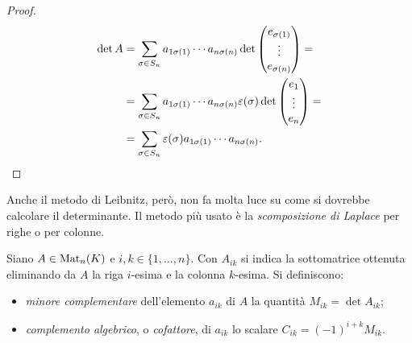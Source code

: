 \begin{proof}
\begin{equation*}
		\begin{split}
			\det A&=\sum_{\sigma\in S_n}a_{1\sigma(1)}\cdots a_{n\sigma(n)}\det\begin{pmatrix}e_{\sigma(1)}\\\vdots\\e_{\sigma(n)}\end{pmatrix}=\\
			&=\sum_{\sigma\in S_n}a_{1\sigma(1)}\cdots a_{n\sigma(n)}\epsilon(\sigma)\det\begin{pmatrix}e_1\\\vdots\\e_n\end{pmatrix}=\\
			&=\sum_{\sigma\in S_n}\epsilon(\sigma)a_{1\sigma(1)}\cdots a_{n\sigma(n)}.\qedhere
		\end{split}
	\end{equation*}
\end{proof}

Anche il metodo di Leibnitz, però, non fa molta luce su come si dovrebbe calcolare il determinante.
Il metodo più usato è la \emph{scomposizione di Laplace} per righe o per colonne.
\begin{definizione} \label{d:minori-complementi}
	Siano $A\in\mat_n(K)$ e $i,k\in\{1,\dots,n\}$.
	Con $A_{ik}$ si indica la sottomatrice ottenuta eliminando da $A$ la riga $i$-esima e la colonna $k$-esima.
	Si definiscono:
	\begin{itemize}
		\item \emph{minore complementare} dell'elemento $a_{ik}$ di $A$ la quantità $M_{ik}=\det A_{ik}$;
		\item \emph{complemento algebrico}, o \emph{cofattore}, di $a_{ik}$ lo scalare $C_{ik}=(-1)^{i+k}M_{ik}$.
	\end{itemize}
\end{definizione}

